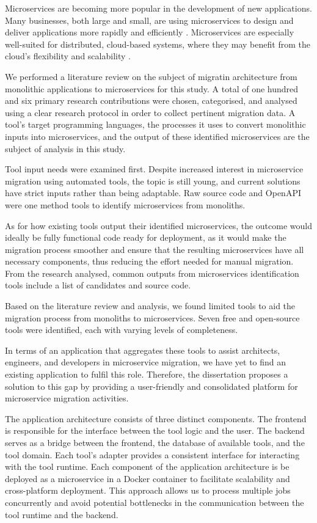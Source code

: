 Microservices are becoming more popular in the development of new applications.
Many businesses, both large and small, are using microservices to design and
deliver applications more rapidly and efficiently
. Microservices are especially well-suited for
distributed, cloud-based systems, where they may benefit from the cloud's
flexibility and scalability .

We performed a literature review on the subject of migratin architecture from
monolithic applications to microservices for this study. A total of one hundred
and six primary research contributions were chosen, categorised, and analysed
using a clear research protocol in order to collect pertinent migration data. A
tool's target programming languages, the processes it uses to convert
monolithic inputs into microservices, and the output of these identified
microservices are the subject of analysis in this study.

Tool input needs were examined first. Despite increased interest in
microservice migration using automated tools, the topic is still young, and
current solutions have strict inputs rather than being adaptable. Raw source
code and OpenAPI were one method tools to identify microservices from
monoliths.

As for how existing tools output their identified microservices, the outcome
would ideally be fully functional code ready for deployment, as it would make
the migration process smoother and ensure that the resulting microservices have
all necessary components, thus reducing the effort needed for manual migration.
From the research analysed, common outputs from microservices identification
tools include a list of candidates and source code.

Based on the literature review and analysis, we found limited tools to aid the
migration process from monoliths to microservices. Seven free and open-source
tools were identified, each with varying levels of completeness.

In terms of an application that aggregates these tools to assist architects,
engineers, and developers in microservice migration, we have yet to find an
existing application to fulfil this role. Therefore, the dissertation proposes
a solution to this gap by providing a user-friendly and consolidated platform
for microservice migration activities.

The application architecture consists of three distinct components. The
frontend is responsible for the interface between the tool logic and the user.
The backend serves as a bridge between the frontend, the database of available
tools, and the tool domain. Each tool's adapter provides a consistent interface
for interacting with the tool runtime. Each component of the application
architecture is be deployed as a microservice in a Docker container to
facilitate scalability and cross-platform deployment. This approach allows us
to process multiple jobs concurrently and avoid potential bottlenecks in the
communication between the tool runtime and the backend.

